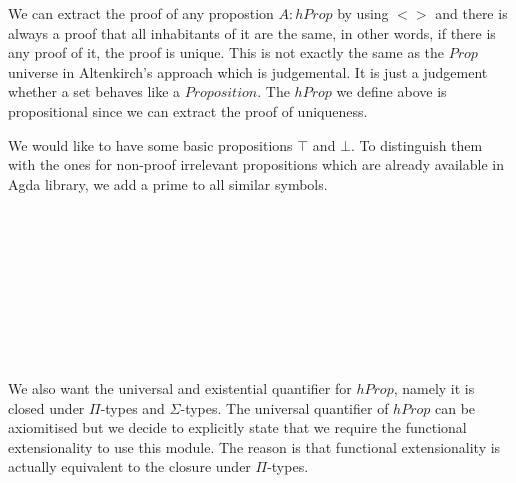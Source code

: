 We can extract the proof of any propostion $A : hProp$ by using $<>$ and there is always a proof that all inhabitants of it are the same, in other words, if there is any proof of it, the proof is unique. This is not exactly the same as the $Prop$ universe in Altenkirch's approach which is judgemental. It is just a judgement whether a set behaves like a $Proposition$. The $hProp$ we define above is propositional since we can extract the proof of uniqueness.

We would like to have some basic propositions $\top$ and $\bot$. To distinguish them with the ones for non-proof irrelevant propositions which are already available in Agda library, we add a prime to all similar symbols.

\begin{code}\>\<%
\\
%
\\
\> \AgdaSymbol{:} \<%
\\
\> \AgdaSymbol{=}   \<%
\\
%
\\
\> \AgdaSymbol{:} \<%
\\
\> \AgdaSymbol{=}    \AgdaSymbol{\{}\AgdaSymbol{\}}   \AgdaSymbol{)}\<%
\\
%
\\
\>\<\end{code}

We also want the universal and existential quantifier for $hProp$, namely it is closed under $\Pi$-types and $\Sigma$-types.
The universal quantifier of $hProp$ can be axiomitised but we decide to explicitly state that we 
require the functional extensionality to use this module. The reason is that functional extensionality is actually equivalent to the closure under $\Pi$-types.

\begin{code}\>\<%
\\
%
\\
\> \AgdaSymbol{:} \AgdaSymbol{(} \AgdaSymbol{:} \AgdaSymbol{)(} \AgdaSymbol{:}   \AgdaSymbol{)}  \<%
\\
\>   \AgdaSymbol{=}  \AgdaSymbol{((} \AgdaSymbol{:} \AgdaSymbol{)}  \AgdaFunction{<}   \AgdaFunction{>}\AgdaSymbol{)} \AgdaSymbol{(}     \AgdaSymbol{(} \AgdaSymbol{)))}\<%
\\
%
\\
\>\<\end{code}


